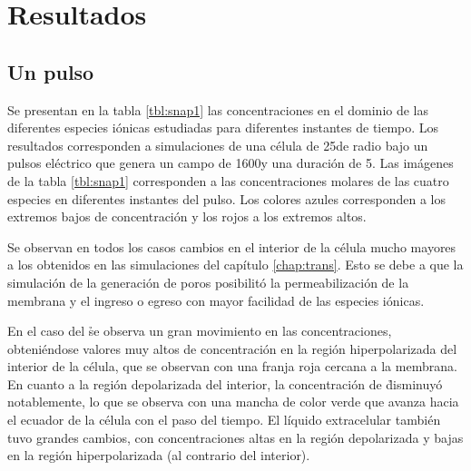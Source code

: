
\section{Resultados}

\subsection*{Un pulso}

\newcommand{\lineasnap}[7]{
	#2 &
	\texttt{[image: \#1\#3.png]} & 
	\texttt{[image: \#1\#4.png]} & 
	\texttt{[image: \#1\#5.png]} & 
	\texttt{[image: \#1\#6.png]} & 
	\texttt{[image: \#1\#7.png]} \\
}

Se presentan en la tabla \ref{tbl:snap1} las concentraciones en el dominio de las diferentes especies iónicas estudiadas para diferentes instantes de tiempo. Los resultados corresponden a simulaciones de una célula de 25\usec de radio bajo un pulsos eléctrico que genera un campo de 1600\vcm y una duración de 5\ms. Las imágenes de la tabla \ref{tbl:snap1} corresponden a las concentraciones molares de las cuatro especies en diferentes instantes del pulso. Los colores azules corresponden a los extremos bajos de concentración y los rojos a los extremos altos.

Se observan en todos los casos cambios en el interior de la célula mucho mayores a los obtenidos en las simulaciones del capítulo \ref{chap:trans}. Esto se debe a que la simulación de la generación de poros posibilitó la permeabilización de la membrana y el ingreso o egreso con mayor facilidad de las especies iónicas. 

En el caso del \h se observa un gran movimiento en las concentraciones, obteniéndose valores muy altos de concentración en la región hiperpolarizada del interior de la célula, que se observan con una franja roja cercana a la membrana. En cuanto a la región depolarizada del interior, la concentración de \h disminuyó notablemente, lo que se observa con una mancha de color verde que avanza hacia el ecuador de la célula con el paso del tiempo. El líquido extracelular también tuvo grandes cambios, con concentraciones altas en la región depolarizada y bajas en la región hiperpolarizada (al contrario del interior).

